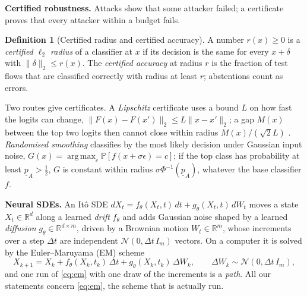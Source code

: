 \documentclass{article}
\theoremstyle{definition}
\newtheorem{definition}{Definition}
\newcommand{\Real}{\mathbb{R}}
\newcommand{\Prob}{\mathbb{P}}
\DeclareMathOperator*{\argmax}{arg\,max}
\begin{document}
\textbf{Certified robustness.} Attacks show that some attacker failed; a
certificate proves that every attacker within a budget fails.

\begin{definition}[Certified radius and certified accuracy]\label{def:cert}
A number $r(x)\ge0$ is a \emph{certified $\ell_2$ radius} of a classifier at $x$
if its decision is the same for every $x+\delta$ with $\|\delta\|_2\le r(x)$. The
\emph{certified accuracy} at radius $r$ is the fraction of test flows that are
classified correctly with radius at least $r$; abstentions count as errors.
\end{definition}

Two routes give certificates. A \emph{Lipschitz} certificate uses a bound $L$
on how fast the logits can change, $\|F(x)-F(x')\|_2\le L\|x-x'\|_2$; a gap $M(x)$
between the top two logits then cannot close within radius $M(x)/(\sqrt2L)$
\citep{tsuzuku2018lipschitz}. \emph{Randomised smoothing}
\citep{cohen2019smoothing} classifies by the most likely decision under Gaussian
input noise, $G(x)=\argmax_c\Prob[f(x+\sigma\epsilon)=c]$; if the top class has
probability at least $\underline p_A>\tfrac12$, $G$ is constant within radius
$\sigma\Phi^{-1}(\underline p_A)$, whatever the base classifier $f$.

\textbf{Neural SDEs.} An It\^o SDE
$dX_t=f_\theta(X_t,t)\,dt+g_\theta(X_t,t)\,dW_t$ moves a state $X_t\in\Real^d$
along a learned \emph{drift} $f_\theta$ and adds Gaussian noise shaped by a
learned \emph{diffusion} $g_\theta\in\Real^{d\times m}$, driven by a Brownian
motion $W_t\in\Real^m$, whose increments over a step $\Delta t$ are independent
$\mathcal N(0,\Delta t\,I_m)$ vectors. On a computer it is solved by the
Euler--Maruyama (EM) scheme
\begin{equation}\label{eq:em}
  X_{k+1}=X_k+f_\theta(X_k,t_k)\,\Delta t+g_\theta(X_k,t_k)\,\Delta W_k,\qquad
  \Delta W_k\sim\mathcal N(0,\Delta t\,I_m),
\end{equation}
and one run of \eqref{eq:em} with one draw of the increments is a \emph{path}.
All our statements concern \eqref{eq:em}, the scheme that is actually run.

\end{document}
